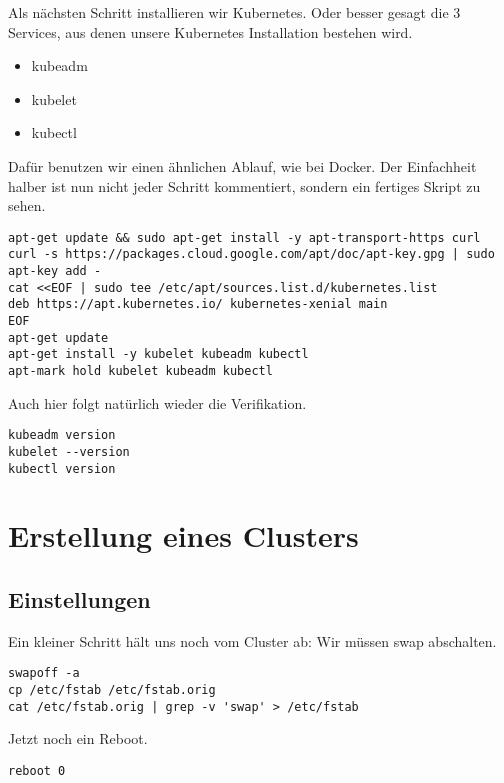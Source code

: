 Als nächsten Schritt installieren wir Kubernetes. Oder besser gesagt die
3 Services, aus denen unsere Kubernetes Installation bestehen wird.

\begin{itemize}
\tightlist
\item
  kubeadm
\item
  kubelet
\item
  kubectl
\end{itemize}

Dafür benutzen wir einen ähnlichen Ablauf, wie bei Docker. Der
Einfachheit halber ist nun nicht jeder Schritt kommentiert, sondern ein
fertiges Skript zu sehen.

\begin{verbatim}
apt-get update && sudo apt-get install -y apt-transport-https curl
curl -s https://packages.cloud.google.com/apt/doc/apt-key.gpg | sudo apt-key add -
cat <<EOF | sudo tee /etc/apt/sources.list.d/kubernetes.list
deb https://apt.kubernetes.io/ kubernetes-xenial main
EOF
apt-get update
apt-get install -y kubelet kubeadm kubectl
apt-mark hold kubelet kubeadm kubectl
\end{verbatim}

Auch hier folgt natürlich wieder die Verifikation.

\begin{verbatim}
kubeadm version
kubelet --version
kubectl version
\end{verbatim}

\hypertarget{erstellung-eines-clusters}{%
\section{Erstellung eines Clusters}\label{erstellung-eines-clusters}}

\hypertarget{einstellungen}{%
\subsection{Einstellungen}\label{einstellungen}}

Ein kleiner Schritt hält uns noch vom Cluster ab: Wir müssen swap
abschalten.

\begin{verbatim}
swapoff -a
cp /etc/fstab /etc/fstab.orig
cat /etc/fstab.orig | grep -v 'swap' > /etc/fstab
\end{verbatim}

Jetzt noch ein Reboot.

\begin{verbatim}
reboot 0
\end{verbatim}


